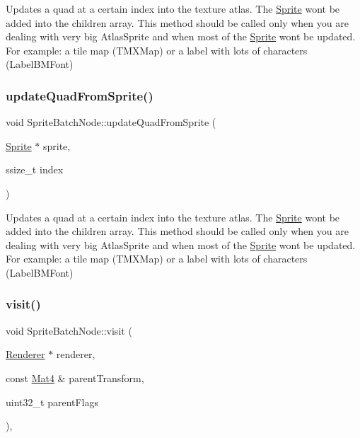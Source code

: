 Updates a quad at a certain index into the texture atlas. The \hyperlink{classSprite}{Sprite} won\textquotesingle{}t be added into the children array. This method should be called only when you are dealing with very big Atlas\+Sprite and when most of the \hyperlink{classSprite}{Sprite} won\textquotesingle{}t be updated. For example\+: a tile map (T\+M\+X\+Map) or a label with lots of characters (Label\+B\+M\+Font) \mbox{\label{classSpriteBatchNode_a408788d1a225c2cb9787a4657d861b20}} 
\subsubsection{\texorpdfstring{update\+Quad\+From\+Sprite()}{updateQuadFromSprite()}\hspace{0.1cm}{\footnotesize\ttfamily [2/2]}}
{\footnotesize\ttfamily void Sprite\+Batch\+Node\+::update\+Quad\+From\+Sprite (\begin{DoxyParamCaption}\item[{\hyperlink{classSprite}{Sprite} $\ast$}]{sprite,  }\item[{ssize\+\_\+t}]{index }\end{DoxyParamCaption})\hspace{0.3cm}{\ttfamily [protected]}}

Updates a quad at a certain index into the texture atlas. The \hyperlink{classSprite}{Sprite} won\textquotesingle{}t be added into the children array. This method should be called only when you are dealing with very big Atlas\+Sprite and when most of the \hyperlink{classSprite}{Sprite} won\textquotesingle{}t be updated. For example\+: a tile map (T\+M\+X\+Map) or a label with lots of characters (Label\+B\+M\+Font) \mbox{\label{classSpriteBatchNode_afcdd1f0032ac902a52256fee7687cc36}} 
\subsubsection{\texorpdfstring{visit()}{visit()}\hspace{0.1cm}{\footnotesize\ttfamily [1/2]}}
{\footnotesize\ttfamily void Sprite\+Batch\+Node\+::visit (\begin{DoxyParamCaption}\item[{\hyperlink{classRenderer}{Renderer} $\ast$}]{renderer,  }\item[{const \hyperlink{classMat4}{Mat4} \&}]{parent\+Transform,  }\item[{uint32\+\_\+t}]{parent\+Flags }\end{DoxyParamCaption})\hspace{0.3cm}{\ttfamily [override]}, {\ttfamily [virtual]}}

